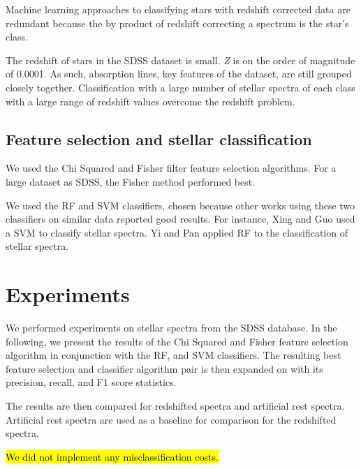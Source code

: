 \documentclass[conference]{IEEEtran}
\DeclareRobustCommand{\hlcyan}[1]{{\sethlcolor{cyan}\hl{#1}}}
\begin{document}
	Machine learning approaches to classifying stars with redshift corrected data are redundant because the by product of redshift correcting a spectrum is the star's class.

	The redshift of stars in the SDSS dataset is small. \textit{Z} is on the order of magnitude of 0.0001. As such, absorption lines, key features of the dataset, are still grouped closely together. Classification with a large number of stellar spectra of each class with a large range of redshift values overcome the redshift problem.    

	\subsection{Feature selection and stellar classification}\label{sec:alg}

We used the Chi Squared \cite{scikit-learn} and Fisher \cite{reliefF} filter feature selection algorithms. For a large dataset as SDSS, the Fisher method performed best.

We used the RF and SVM classifiers, chosen because other works using these two classifiers on similar data reported good results.  For instance, Xing and Guo \cite{Xing} used a SVM to classify stellar spectra. Yi and Pan \cite{YI} applied RF to the classification of stellar spectra. 


\section{Experiments}\label{sec:experiments}

We performed experiments on stellar spectra from the SDSS database. In the following, we present the results of the Chi Squared and Fisher feature selection algorithm in conjunction with the RF, and SVM classifiers. The resulting best feature selection and classifier algorithm pair is then expanded on with its precision, recall, and F1 score statistics.

The results are then compared for redshifted spectra and artificial rest spectra. Artificial rest spectra are used as a baseline for comparison for the redshifted spectra. 

\hlcyan{We did not implement any misclassification costs.} 
\end{document}
